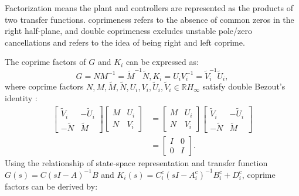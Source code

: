 \documentclass[trsc,nonblindrev]{informs3} %
\begin{document}
Factorization means the plant and controllers are represented as the products of two transfer functions. coprimeness refers to the absence of common zeros in the right half-plane, and double coprimeness excludes unstable pole/zero cancellations and refers to the idea of being right and left coprime.

The coprime factors of $G$ and $K_i$ can be expressed as:
\begin{equation}
    G=N M^{-1}=\tilde{M}^{-1} \tilde{N}, K_{i}=U_{i} V_{i}^{-1}=\tilde{V}_{i}^{-1} \tilde{U}_{i},
\end{equation}
where coprime factors $N, M, \tilde{M}, \tilde{N}, U_{i}, V_{i}, \tilde{U}_{i}, \tilde{V}_{i} \in \mathbb{R} H_{\infty}$ satisfy double Bezout's identity \citep{pommaret1998generalized}:
\begin{equation}
    \begin{aligned}
        \left[\begin{array}{cc}
                \tilde{V}_{i} & -\tilde{U}_{i} \\
                -\tilde{N}    & \tilde{M}
            \end{array}\right]\left[\begin{array}{cc}
                M & U_{i} \\
                N & V_{i}
            \end{array}\right]
         & =\left[\begin{array}{cc}
                M & U_{i} \\
                N & V_{i}
            \end{array}\right]\left[\begin{array}{cc}
                \tilde{V}_{i} & -\tilde{U}_{i} \\
                -\tilde{N}    & \tilde{M}
            \end{array}\right] \\
         & =\left[\begin{array}{cc}
                I & 0 \\
                0 & I
            \end{array}\right].
    \end{aligned}
    \label{Eq16}
\end{equation}
Using the relationship of state-space representation and transfer function $G(s)=C(sI-A)^{-1} B$ and $K_i (s)=C_i^c (sI-A_i^c)^{-1} B_i^c+D_i^c$, coprime factors can be derived by:
\end{document}
